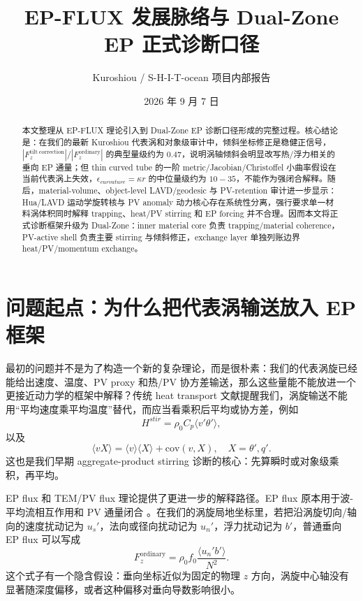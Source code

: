 \documentclass[11pt,a4paper]{ctexart}
\title{EP-FLUX 发展脉络与 Dual-Zone EP 正式诊断口径}
\author{Kuroshiou / S-H-I-T-ocean 项目内部报告}
\date{2026 年 9 月 7 日}
\begin{document}
\maketitle

\begin{abstract}
本文整理从 EP-FLUX 理论引入到 Dual-Zone EP 诊断口径形成的完整过程。核心结论是：在我们的最新 Kuroshiou 代表涡和对象级审计中，倾斜坐标修正是稳健正信号，$|F_z^{\mathrm{tilt\ correction}}|/|F_z^{\mathrm{ordinary}}|$ 的典型量级约为 $0.47$，说明涡轴倾斜会明显改写热/浮力相关的垂向 EP 通量；但 thin curved tube 的一阶 metric/Jacobian/Christoffel 小曲率假设在当前代表涡上失效，$\epsilon_{curvature}=\kappa r$ 的中位量级约为 $10-35$，不能作为强闭合解释。随后，material-volume、object-level LAVD/geodesic 与 PV-retention 审计进一步显示：Hua/LAVD 运动学旋转核与 PV anomaly 动力核心存在系统性分离，强行要求单一材料涡体积同时解释 trapping、heat/PV stirring 和 EP forcing 并不合理。因而本文将正式诊断框架升级为 Dual-Zone：inner material core 负责 trapping/material coherence，PV-active shell 负责主要 stirring 与倾斜修正，exchange layer 单独列账边界 heat/PV/momentum exchange。
\end{abstract}

\tableofcontents
\newpage

\section{问题起点：为什么把代表涡输送放入 EP 框架}

最初的问题并不是为了构造一个新的复杂理论，而是很朴素：我们的代表涡旋已经能给出速度、温度、PV proxy 和热/PV 协方差输送，那么这些量能不能放进一个更接近动力学的框架中解释？传统 heat transport 文献提醒我们，涡旋输送不能用“平均速度乘平均温度”替代，而应当看乘积后平均或协方差，例如 \cite{HausmannCzaja2012,DongEtAl2014}
\begin{equation}
  H^{stir}=\rho_0 C_p\langle v'\theta'\rangle,
\end{equation}
以及
\begin{equation}
  \langle vX\rangle=\langle v\rangle\langle X\rangle+\mathrm{cov}(v,X),\quad X=\theta',q'.
\end{equation}
这也是我们早期 aggregate-product stirring 诊断的核心：先算瞬时或对象级乘积，再平均。

EP flux 和 TEM/PV flux 理论提供了更进一步的解释路径。EP flux 原本用于波-平均流相互作用和 PV 通量闭合 \cite{AndrewsMcIntyre1976,Plumb1985}。在我们的涡旋局地坐标里，若把沿涡旋切向/轴向的速度扰动记为 $u_s'$，法向或径向扰动记为 $u_n'$，浮力扰动记为 $b'$，普通垂向 EP flux 可以写成
\begin{equation}
  F_z^{\mathrm{ordinary}}
  =\rho_0 f_0\frac{\langle u_n'b'\rangle}{N^2}.
\end{equation}
这个式子有一个隐含假设：垂向坐标近似为固定的物理 $z$ 方向，涡旋中心轴没有显著随深度偏移，或者这种偏移对垂向导数影响很小。
\end{document}
